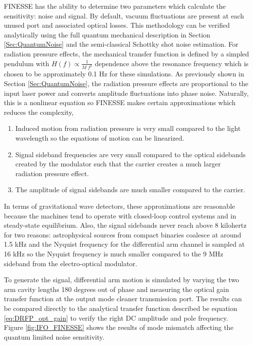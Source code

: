 	FINESSE has the ability to determine two parameters which calculate the sensitivity: noise and signal.  By default, vacuum fluctuations are present at each unused port and associated optical losses.  This methodology can be verified analytically using the full quantum mechanical description in Section \ref{Sec:QuantumNoise} and the semi-classical Schottky shot noise estimation.  For radiation pressure effects, the mechanical transfer function is defined by a simpled pendulum with $H(f) \propto \frac{1}{M \; f^2}$ dependence above the resonance frequency which is chosen to be approximately 0.1 Hz for these simulations.  As previously shown in Section \ref{Sec:QuantumNoise}, the radiation pressure effects are proportional to the input laser power and converts amplitude fluctuations into phase noise.  Naturally, this is a nonlinear equation so FINESSE makes certain approximations which reduces the complexity,
	\begin{enumerate}
		\item Induced motion from radiation pressure is very small compared to the light wavelength so the equations of motion can be linearized.
		\item Signal sideband frequencies are very small compared to the optical sidebands created by the modulator such that the carrier creates a much larger radiation pressure effect.
		\item The amplitude of signal sidebands are much smaller compared to the carrier.
	\end{enumerate}
	In terms of gravitational wave detectors, these approximations are reasonable because the machines tend to operate with closed-loop control systems and in steady-state equilibrium.  Also, the signal sidebands never reach above 8 kilohertz for two reasons: astrophysical sources from compact binaries coalesce at around 1.5 kHz and the Nyquist frequency for the differential arm channel is sampled at 16 kHz so the Nyquist frequency is much smaller compared to the 9 MHz sideband from the electro-optical modulator.  
	
	To generate the signal, differential arm motion is simulated by varying the two arm cavity lengths 180 degrees out of phase and measuring the optical gain transfer function at the output mode cleaner transmission port.  The results can be compared directly to the analytical transfer function described be equation \ref{eq:DRFP_opt_gain} to verify the right DC amplitude and pole frequency.  Figure \ref{fig:IFO_FINESSE} shows the results of mode mismatch affecting the quantum limited noise sensitivity.
	
